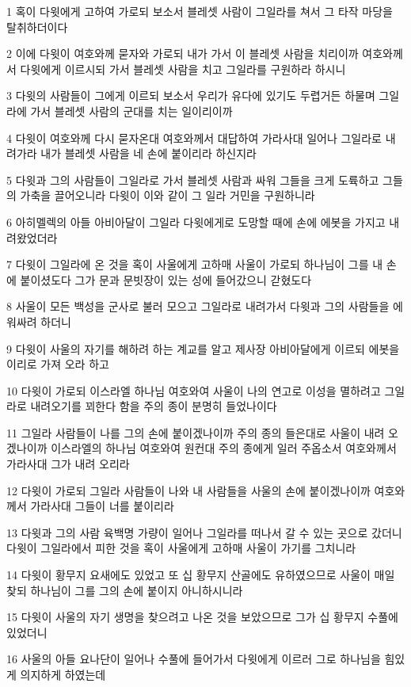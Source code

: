 \par 1 혹이 다윗에게 고하여 가로되 보소서 블레셋 사람이 그일라를 쳐서 그 타작 마당을 탈취하더이다
\par 2 이에 다윗이 여호와께 묻자와 가로되 내가 가서 이 블레셋 사람을 치리이까 여호와께서 다윗에게 이르시되 가서 블레셋 사람을 치고 그일라를 구원하라 하시니
\par 3 다윗의 사람들이 그에게 이르되 보소서 우리가 유다에 있기도 두렵거든 하물며 그일라에 가서 블레셋 사람의 군대를 치는 일이리이까
\par 4 다윗이 여호와께 다시 묻자온대 여호와께서 대답하여 가라사대 일어나 그일라로 내려가라 내가 블레셋 사람을 네 손에 붙이리라 하신지라
\par 5 다윗과 그의 사람들이 그일라로 가서 블레셋 사람과 싸워 그들을 크게 도륙하고 그들의 가축을 끌어오니라 다윗이 이와 같이 그 일라 거민을 구원하니라
\par 6 아히멜렉의 아들 아비아달이 그일라 다윗에게로 도망할 때에 손에 에봇을 가지고 내려왔었더라
\par 7 다윗이 그일라에 온 것을 혹이 사울에게 고하매 사울이 가로되 하나님이 그를 내 손에 붙이셨도다 그가 문과 문빗장이 있는 성에 들어갔으니 갇혔도다
\par 8 사울이 모든 백성을 군사로 불러 모으고 그일라로 내려가서 다윗과 그의 사람들을 에워싸려 하더니
\par 9 다윗이 사울의 자기를 해하려 하는 계교를 알고 제사장 아비아달에게 이르되 에봇을 이리로 가져 오라 하고
\par 10 다윗이 가로되 이스라엘 하나님 여호와여 사울이 나의 연고로 이성을 멸하려고 그일라로 내려오기를 꾀한다 함을 주의 종이 분명히 들었나이다
\par 11 그일라 사람들이 나를 그의 손에 붙이겠나이까 주의 종의 들은대로 사울이 내려 오겠나이까 이스라엘의 하나님 여호와여 원컨대 주의 종에게 일러 주옵소서 여호와께서 가라사대 그가 내려 오리라
\par 12 다윗이 가로되 그일라 사람들이 나와 내 사람들을 사울의 손에 붙이겠나이까 여호와께서 가라사대 그들이 너를 붙이리라
\par 13 다윗과 그의 사람 육백명 가량이 일어나 그일라를 떠나서 갈 수 있는 곳으로 갔더니 다윗이 그일라에서 피한 것을 혹이 사울에게 고하매 사울이 가기를 그치니라
\par 14 다윗이 황무지 요새에도 있었고 또 십 황무지 산골에도 유하였으므로 사울이 매일 찾되 하나님이 그를 그의 손에 붙이지 아니하시니라
\par 15 다윗이 사울의 자기 생명을 찾으려고 나온 것을 보았으므로 그가 십 황무지 수풀에 있었더니
\par 16 사울의 아들 요나단이 일어나 수풀에 들어가서 다윗에게 이르러 그로 하나님을 힘있게 의지하게 하였는데
